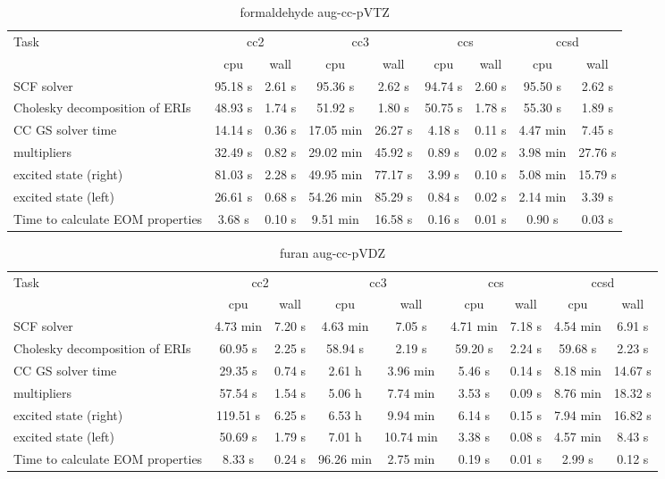 \documentclass{article}
\begin{document}
\begin{table}
\caption{formaldehyde aug-cc-pVTZ}
\begin{tabular}{lcccccccc}
\toprule
Task & \multicolumn{2}{c}{cc2} & \multicolumn{2}{c}{cc3} & \multicolumn{2}{c}{ccs} & \multicolumn{2}{c}{ccsd}\\
\cmidrule(lr){2-3}\cmidrule(lr){4-5}\cmidrule(lr){6-7}\cmidrule(lr){8-9}
 & cpu & wall & cpu & wall & cpu & wall & cpu & wall\\
\midrule
SCF solver & 95.18 s & 2.61 s & 95.36 s & 2.62 s & 94.74 s & 2.60 s & 95.50 s & 2.62 s\\
Cholesky decomposition of ERIs & 48.93 s & 1.74 s & 51.92 s & 1.80 s & 50.75 s & 1.78 s & 55.30 s & 1.89 s\\
CC GS solver time & 14.14 s & 0.36 s & 17.05 min & 26.27 s & 4.18 s & 0.11 s & 4.47 min & 7.45 s\\
multipliers & 32.49 s & 0.82 s & 29.02 min & 45.92 s & 0.89 s & 0.02 s & 3.98 min & 27.76 s\\
excited state (right) & 81.03 s & 2.28 s & 49.95 min & 77.17 s & 3.99 s & 0.10 s & 5.08 min & 15.79 s\\
excited state (left) & 26.61 s & 0.68 s & 54.26 min & 85.29 s & 0.84 s & 0.02 s & 2.14 min & 3.39 s\\
Time to calculate EOM properties & 3.68 s & 0.10 s & 9.51 min & 16.58 s & 0.16 s & 0.01 s & 0.90 s & 0.03 s\\
\bottomrule
\end{tabular}
\end{table}
\begin{table}
\caption{furan aug-cc-pVDZ}
\begin{tabular}{lcccccccc}
\toprule
Task & \multicolumn{2}{c}{cc2} & \multicolumn{2}{c}{cc3} & \multicolumn{2}{c}{ccs} & \multicolumn{2}{c}{ccsd}\\
\cmidrule(lr){2-3}\cmidrule(lr){4-5}\cmidrule(lr){6-7}\cmidrule(lr){8-9}
 & cpu & wall & cpu & wall & cpu & wall & cpu & wall\\
\midrule
SCF solver & 4.73 min & 7.20 s & 4.63 min & 7.05 s & 4.71 min & 7.18 s & 4.54 min & 6.91 s\\
Cholesky decomposition of ERIs & 60.95 s & 2.25 s & 58.94 s & 2.19 s & 59.20 s & 2.24 s & 59.68 s & 2.23 s\\
CC GS solver time & 29.35 s & 0.74 s & 2.61 h & 3.96 min & 5.46 s & 0.14 s & 8.18 min & 14.67 s\\
multipliers & 57.54 s & 1.54 s & 5.06 h & 7.74 min & 3.53 s & 0.09 s & 8.76 min & 18.32 s\\
excited state (right) & 119.51 s & 6.25 s & 6.53 h & 9.94 min & 6.14 s & 0.15 s & 7.94 min & 16.82 s\\
excited state (left) & 50.69 s & 1.79 s & 7.01 h & 10.74 min & 3.38 s & 0.08 s & 4.57 min & 8.43 s\\
Time to calculate EOM properties & 8.33 s & 0.24 s & 96.26 min & 2.75 min & 0.19 s & 0.01 s & 2.99 s & 0.12 s\\
\bottomrule
\end{tabular}
\end{table}
\end{document}
